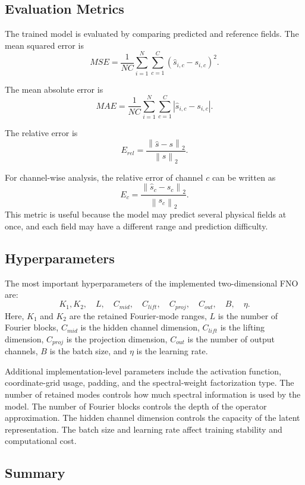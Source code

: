 \documentclass[14pt]{extarticle}
\begin{document}
\subsection{Evaluation Metrics}

The trained model is evaluated by comparing predicted and reference fields. The mean squared error is
\[
MSE
=
\frac{1}{NC}
\sum_{i=1}^{N}
\sum_{c=1}^{C}
\left(
\hat{s}_{i,c}
-
s_{i,c}
\right)^2.
\]

The mean absolute error is
\[
MAE
=
\frac{1}{NC}
\sum_{i=1}^{N}
\sum_{c=1}^{C}
\left|
\hat{s}_{i,c}
-
s_{i,c}
\right|.
\]

The relative error is
\[
E_{rel}
=
\frac{
\left\|
\hat{s}
-
s
\right\|_2
}{
\left\|
s
\right\|_2
}.
\]

For channel-wise analysis, the relative error of channel \(c\) can be written as
\[
E_c
=
\frac{
\left\|
\hat{s}_{c}
-
s_{c}
\right\|_2
}{
\left\|
s_c
\right\|_2
}.
\]
This metric is useful because the model may predict several physical fields at once, and each field may have a different range and prediction difficulty.

\subsection{Hyperparameters}

The most important hyperparameters of the implemented two-dimensional FNO are:
\[
K_1, K_2,
\quad
L,
\quad
C_{mid},
\quad
C_{lift},
\quad
C_{proj},
\quad
C_{out},
\quad
B,
\quad
\eta.
\]
Here, \(K_1\) and \(K_2\) are the retained Fourier-mode ranges, \(L\) is the number of Fourier blocks, \(C_{mid}\) is the hidden channel dimension, \(C_{lift}\) is the lifting dimension, \(C_{proj}\) is the projection dimension, \(C_{out}\) is the number of output channels, \(B\) is the batch size, and \(\eta\) is the learning rate.

Additional implementation-level parameters include the activation function, coordinate-grid usage, padding, and the spectral-weight factorization type. The number of retained modes controls how much spectral information is used by the model. The number of Fourier blocks controls the depth of the operator approximation. The hidden channel dimension controls the capacity of the latent representation. The batch size and learning rate affect training stability and computational cost.

\subsection{Summary}
\end{document}
